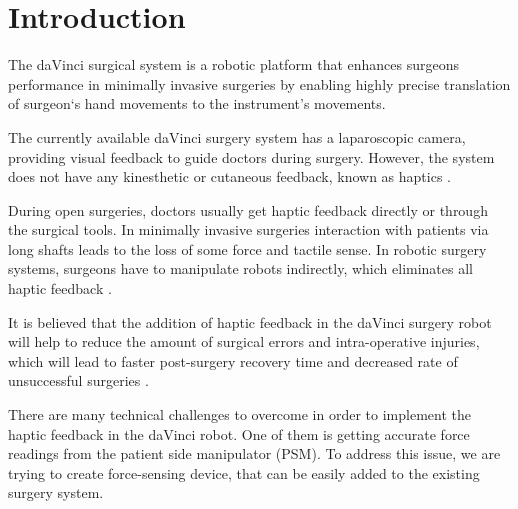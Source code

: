 \chapter{Introduction}
\label{intro} %


The daVinci surgical system is a robotic platform that enhances surgeons performance in minimally invasive surgeries by enabling highly precise translation of surgeon`s hand movements to the instrument's movements. 

The currently available daVinci surgery system 
has a laparoscopic camera, providing visual feedback to guide doctors during surgery. However, the system does not have any kinesthetic or cutaneous feedback, known as haptics \cite{_intuitive_2018}.


During open surgeries, doctors usually get haptic feedback directly or through the surgical tools. In minimally invasive surgeries interaction with patients via long shafts leads to the loss of some force and tactile sense. In robotic surgery systems, surgeons have to manipulate robots indirectly, which eliminates all haptic feedback \cite{okamura_haptic_2009}.

It is believed that the addition of haptic feedback in the daVinci surgery 
robot will help to reduce the amount of surgical errors and intra-operative 
injuries, which will lead to faster post-surgery recovery time and decreased 
rate of unsuccessful surgeries \cite{reiley_effects_2008, van_der_meijden_value_2009, okamura_haptic_2009}.

There are many technical challenges to overcome in order to implement the haptic feedback in the daVinci robot. One of them is getting accurate force readings from the patient side manipulator (PSM). To address this issue, we are trying to create force-sensing device, that can be easily added to the existing surgery system.